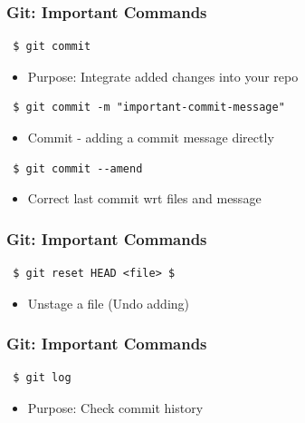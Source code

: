 \documentclass{beamer} %
\begin{document}
\begin{frame}[t, fragile]
\frametitle{Git: Important Commands}

\begin{verbatim} 
 $ git commit
\end{verbatim}

\begin{itemize}
	\setlength\itemsep{1em}
	\item Purpose: Integrate added changes into your repo
\end{itemize}

\begin{verbatim} 
 $ git commit -m "important-commit-message"
\end{verbatim}

\begin{itemize}
	\setlength\itemsep{1em}
	\item Commit - adding a commit message directly
\end{itemize}

\begin{verbatim} 
 $ git commit --amend
\end{verbatim}

\begin{itemize}
	\setlength\itemsep{1em}
	\item Correct last commit wrt files and message
\end{itemize}
\end{frame}

\begin{frame}[t, fragile]
\frametitle{Git: Important Commands}

\begin{verbatim} 
 $ git reset HEAD <file> $
\end{verbatim}

\begin{itemize}
    \setlength\itemsep{1em}
	\item Unstage a file (Undo adding)
\end{itemize}
\end{frame}

\begin{frame}[t, fragile]
\frametitle{Git: Important Commands}

\begin{verbatim} 
 $ git log
\end{verbatim}

\begin{itemize}
	\setlength\itemsep{1em}
	\item Purpose: Check commit history
\end{itemize}
\end{frame}
\end{document}

